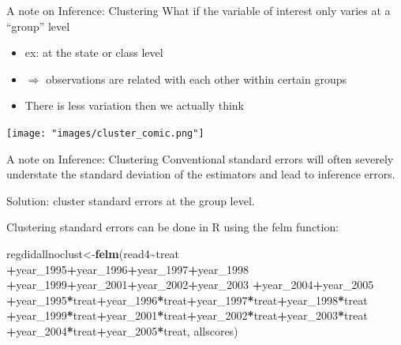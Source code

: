 \documentclass[
  ignorenonframetext,
]{beamer}
\newenvironment{Shaded}{\begin{snugshade}}{\end{snugshade}}
\newcommand{\FunctionTok}[1]{\textcolor[rgb]{0.13,0.29,0.53}{\textbf{#1}}}
\newcommand{\NormalTok}[1]{#1}
\newcommand{\OtherTok}[1]{\textcolor[rgb]{0.56,0.35,0.01}{#1}}
\newcommand{\SpecialCharTok}[1]{\textcolor[rgb]{0.81,0.36,0.00}{\textbf{#1}}}
\begin{document}
\begin{frame}{A note on Inference: Clustering}
\protect\hypertarget{a-note-on-inference-clustering}{}
What if the variable of interest only varies at a ``group'' level

\begin{itemize}
\item
  ex: at the state or class level
\item
  \(\Rightarrow\) observations are related with each other within
  certain groups
\item
  There is less variation then we actually think
\end{itemize}

\texttt{[image: "images/cluster\_comic.png"]}
\end{frame}

\begin{frame}[fragile]{A note on Inference: Clustering}
\protect\hypertarget{a-note-on-inference-clustering-1}{}
Conventional standard errors will often severely understate the standard
deviation of the estimators and lead to inference errors.

Solution: cluster standard errors at the group level.

Clustering standard errors can be done in R using the felm function:
\tiny

\begin{Shaded}
\begin{Highlighting}[]
\NormalTok{regdidallnoclust}\OtherTok{\textless{}{-}}\FunctionTok{felm}\NormalTok{(read4}\SpecialCharTok{\textasciitilde{}}\NormalTok{treat}
                 \SpecialCharTok{+}\NormalTok{year\_1995}\SpecialCharTok{+}\NormalTok{year\_1996}\SpecialCharTok{+}\NormalTok{year\_1997}\SpecialCharTok{+}\NormalTok{year\_1998}
                 \SpecialCharTok{+}\NormalTok{year\_1999}\SpecialCharTok{+}\NormalTok{year\_2001}\SpecialCharTok{+}\NormalTok{year\_2002}\SpecialCharTok{+}\NormalTok{year\_2003}
                 \SpecialCharTok{+}\NormalTok{year\_2004}\SpecialCharTok{+}\NormalTok{year\_2005}
                 \SpecialCharTok{+}\NormalTok{year\_1995}\SpecialCharTok{*}\NormalTok{treat}\SpecialCharTok{+}\NormalTok{year\_1996}\SpecialCharTok{*}\NormalTok{treat}\SpecialCharTok{+}\NormalTok{year\_1997}\SpecialCharTok{*}\NormalTok{treat}\SpecialCharTok{+}\NormalTok{year\_1998}\SpecialCharTok{*}\NormalTok{treat}
                 \SpecialCharTok{+}\NormalTok{year\_1999}\SpecialCharTok{*}\NormalTok{treat}\SpecialCharTok{+}\NormalTok{year\_2001}\SpecialCharTok{*}\NormalTok{treat}\SpecialCharTok{+}\NormalTok{year\_2002}\SpecialCharTok{*}\NormalTok{treat}\SpecialCharTok{+}\NormalTok{year\_2003}\SpecialCharTok{*}\NormalTok{treat}
                 \SpecialCharTok{+}\NormalTok{year\_2004}\SpecialCharTok{*}\NormalTok{treat}\SpecialCharTok{+}\NormalTok{year\_2005}\SpecialCharTok{*}\NormalTok{treat,}
\NormalTok{                 allscores)}


\end{Highlighting}
\end{Shaded}
\end{frame}
\end{document}
